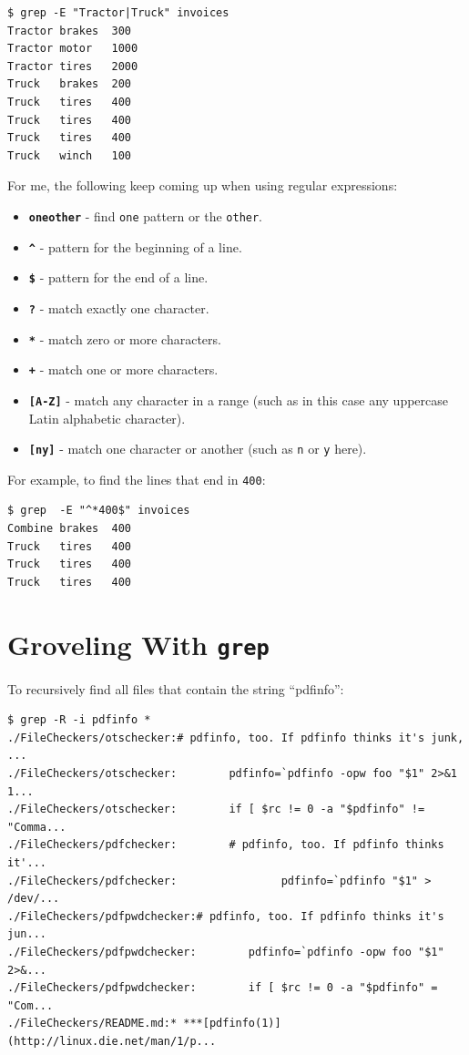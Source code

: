 \documentclass[10pt,]{book}
\numberwithin{figure}{chapter}
\begin{document}
\begin{verbatim}
$ grep -E "Tractor|Truck" invoices
Tractor brakes  300
Tractor motor   1000
Tractor tires   2000
Truck   brakes  200
Truck   tires   400
Truck   tires   400
Truck   tires   400
Truck   winch   100
\end{verbatim}

For me, the following keep coming up when using regular expressions:

\begin{itemize}
\itemsep1pt\parskip0pt
\item
  \textbf{\texttt{one\textbar{}other}} - find \texttt{one} pattern or
  the \texttt{other}.
\item
  \textbf{\texttt{\^{}}} - pattern for the beginning of a line.
\item
  \textbf{\texttt{\$}} - pattern for the end of a line.
\item
  \textbf{\texttt{?}} - match exactly one character.
\item
  \textbf{\texttt{*}} - match zero or more characters.
\item
  \textbf{\texttt{+}} - match one or more characters.
\item
  \textbf{\texttt{{[}A-Z{]}}} - match any character in a range (such as
  in this case any uppercase Latin alphabetic character).
\item
  \textbf{\texttt{{[}n\textbar{}y{]}}} - match one character or another
  (such as \texttt{n} or \texttt{y} here).
\end{itemize}

For example, to find the lines that end in \texttt{400}:

\begin{verbatim}
$ grep  -E "^*400$" invoices
Combine brakes  400
Truck   tires   400
Truck   tires   400
Truck   tires   400
\end{verbatim}

\section{Groveling With \texttt{grep}}\label{groveling-with-grep}

To recursively find all files that contain the string ``pdfinfo'':

\begin{verbatim}
$ grep -R -i pdfinfo *
./FileCheckers/otschecker:# pdfinfo, too. If pdfinfo thinks it's junk, ...
./FileCheckers/otschecker:        pdfinfo=`pdfinfo -opw foo "$1" 2>&1 1...
./FileCheckers/otschecker:        if [ $rc != 0 -a "$pdfinfo" != "Comma...
./FileCheckers/pdfchecker:        # pdfinfo, too. If pdfinfo thinks it'...
./FileCheckers/pdfchecker:                pdfinfo=`pdfinfo "$1" > /dev/...
./FileCheckers/pdfpwdchecker:# pdfinfo, too. If pdfinfo thinks it's jun...
./FileCheckers/pdfpwdchecker:        pdfinfo=`pdfinfo -opw foo "$1" 2>&...
./FileCheckers/pdfpwdchecker:        if [ $rc != 0 -a "$pdfinfo" = "Com...
./FileCheckers/README.md:* ***[pdfinfo(1)](http://linux.die.net/man/1/p...
\end{verbatim}
\end{document}
